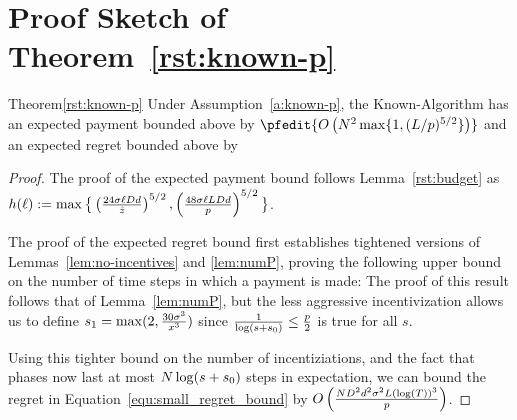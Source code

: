 \section{Proof Sketch of Theorem~\ref{rst:known-p}}
\label{sec:discussion-proof2}


\begin{rtheorem}{Theorem}{\ref{rst:known-p}}
Under Assumption~\ref{a:known-p}, the Known-\MinProb Algorithm has an expected payment bounded above by 
$\pfedit{O\left(N^2 \max\{1, (L/p)^{5/2}\}\right)}$
and an expected regret bounded above by
\end{rtheorem}

\begin{proof}
	The proof of the expected payment bound follows Lemma~\ref{rst:budget} 
    as $h(\ell) := \max\big\{ \left(\frac{24\sigma \ell D d}{\hat{z}} \right)^{5/2},
        \left( \frac{48\sigma \ell L D d}{p} \right)^{5/2}\big\}$.


The proof of the expected regret bound first establishes tightened versions of Lemmas~\ref{lem:no-incentives} and \ref{lem:numP},
proving the following upper bound on the number of time steps in which a payment is made:
The proof of this result follows that of Lemma~\ref{lem:numP},
but the less aggressive incentivization allows us to define $s_1 = \max(2, \frac{30 \sigma^3}{x^3})$ since $\frac{1}{\log(s+s_0)} \leq \frac{p}{2}$ is true for all $s$.

Using this tighter bound on the number of incentiziations, and the fact that phases now last at most $N \log(s+s_0)$ steps in expectation, we can bound the regret in Equation~\ref{equ:small_regret_bound} by
$O\left(\frac{ND^2 d^2\sigma^2 L(\log(T))^3}{p}\right)$.
\end{proof}
